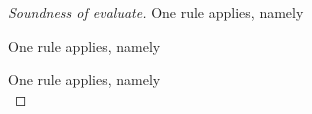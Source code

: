 \begin{proof}[Soundness of evaluate]
    {One rule applies, namely \\
      }

    {One rule applies, namely \\
    }

     {One rule applies, namely \\

}
\end{proof}
